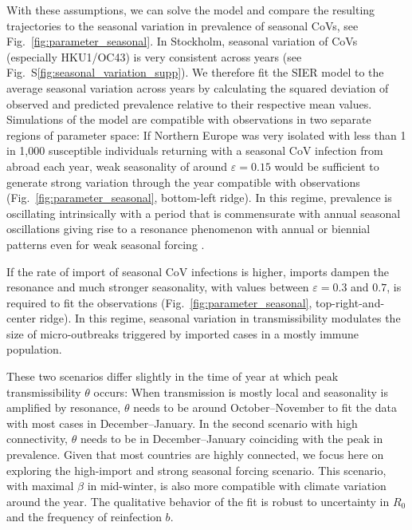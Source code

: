 \documentclass[rmp, reprint, superscriptaddress, floatfix,amsmath]{revtex4-1}
\newcommand{\forcing}{\varepsilon}
\begin{document}
With these assumptions, we can solve the model and compare the resulting trajectories to the seasonal variation in prevalence of seasonal CoVs, see Fig.~\ref{fig:parameter_seasonal}.
In Stockholm, seasonal variation of CoVs (especially HKU1/OC43) is very consistent across years (see Fig.~S\ref{fig:seasonal_variation_supp}).
We therefore fit the SIER model to the average seasonal variation across years by calculating the squared deviation of observed and predicted prevalence relative to their respective mean values.
Simulations of the model are compatible with observations in two separate regions of parameter space: If Northern Europe was very isolated with less than 1 in 1,000 susceptible individuals returning with a seasonal CoV infection from abroad each year, weak seasonality of around $\forcing=0.15$ would be sufficient to generate strong variation through the year compatible with observations (Fig.~\ref{fig:parameter_seasonal}, bottom-left ridge).
In this regime, prevalence is oscillating intrinsically with a period that is commensurate with annual seasonal oscillations giving rise to a resonance phenomenon with annual or biennial patterns even for weak seasonal forcing \citep{dushoff_dynamical_2004,chen_regular_2017}.

If the rate of import of seasonal CoV infections is higher, imports dampen the resonance and much stronger seasonality, with values between $\forcing=0.3$ and $0.7$, is required to fit the observations (Fig.~\ref{fig:parameter_seasonal}, top-right-and-center ridge).
In this regime, seasonal variation in transmissibility modulates the size of micro-outbreaks triggered by imported cases in a mostly immune population.

These two scenarios differ slightly in the time of year at which peak transmissibility $\theta$ occurs:
When transmission is mostly local and seasonality is amplified by resonance, $\theta$ needs to be around October--November to fit the data with most cases in December--January.
In the second scenario with high connectivity, $\theta$ needs to be in December--January coinciding with the peak in prevalence.
Given that most countries are highly connected, we focus here on exploring the high-import and strong seasonal forcing scenario.
This scenario, with maximal $\beta$ in mid-winter, is also more compatible with climate variation around the year.
The qualitative behavior of the fit is robust to uncertainty in $R_0$ and the frequency of reinfection $b$.
\end{document}
